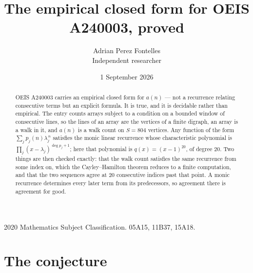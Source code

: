 \documentclass[11pt,a4paper]{article}
\title{The empirical closed form for OEIS A240003, proved}
\author{Adrian Perez Fontelles\\ \small Independent researcher}
\date{1 September 2026}
\theoremstyle{plain}
\theoremstyle{definition}
\begin{document}
\maketitle

\begin{abstract}
OEIS A240003 carries an empirical closed form for $a(n)$ --- not a recurrence relating
consecutive terms but an explicit formula. It is true, and it is decidable rather than
empirical. The entry counts arrays subject to a condition on a bounded window of consecutive lines, so the lines of an array are the
vertices of a finite digraph, an array is a walk in it, and $a(n)$ is a walk count on
$S=804$ vertices. Any function of the form $\sum_j p_j(n)\lambda_j^{\,n}$ satisfies the
monic linear recurrence whose characteristic polynomial is
$\prod_j(x-\lambda_j)^{\deg p_j+1}$; here that polynomial is $q(x)=(x-1)^{20}$, of degree
$20$. Two things are then checked exactly: that the walk count satisfies the same
recurrence from some index on, which the Cayley--Hamilton theorem reduces to a finite
computation, and that the two sequences agree at $20$ consecutive indices past that
point. A monic recurrence determines every later term from its predecessors, so agreement
there is agreement for good.
\end{abstract}

\noindent\small 2020 Mathematics Subject Classification. 05A15, 11B37, 15A18.\normalsize

\section{The conjecture}
\end{document}
